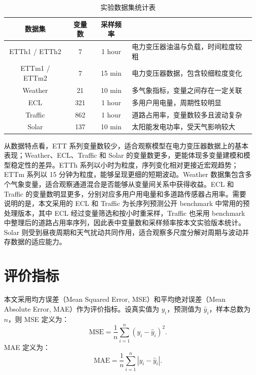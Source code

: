 \begin{table}[htbp]
    \centering
    \caption{实验数据集统计表}
    \label{tab:datasets}
    \begin{tabularx}{\textwidth}{@{}ccc>{\centering\arraybackslash}X@{}}
        \toprule
        \multicolumn{1}{c}{数据集} & \multicolumn{1}{c}{变量数} & \multicolumn{1}{c}{采样频率} & \multicolumn{1}{c}{数据特点} \\
        \midrule
        ETTh1 / ETTh2 & 7 & 1 hour & 电力变压器油温与负载，时间粒度较粗 \\
        ETTm1 / ETTm2 & 7 & 15 min & 电力变压器数据，包含较细粒度变化 \\
        Weather & 21 & 10 min & 多气象指标，变量之间存在一定关联 \\
        ECL & 321 & 1 hour & 多用户用电量，周期性较明显 \\
        Traffic & 862 & 1 hour & 道路占用率，变量数较多且波动复杂 \\
        Solar & 137 & 10 min & 太阳能发电功率，受天气影响较大 \\
        \bottomrule
    \end{tabularx}
\end{table}

从数据特点看，ETT 系列变量数较少，适合观察模型在电力变压器数据上的基本表现；Weather、ECL、Traffic 和 Solar 的变量数更多，更能体现多变量建模和模型稳定性的差异。ETTh 系列以小时为粒度，序列变化相对更接近宏观趋势；ETTm 系列以 15 分钟为粒度，能够呈现更细的短期波动。Weather 数据集包含多个气象变量，适合观察通道混合是否能够从变量间关系中获得收益。ECL 和 Traffic 的变量数明显更多，分别对应多用户用电量和多道路传感器占用率。需要说明的是，本文采用的 ECL 和 Traffic 为长序列预测公开 benchmark 中常用的预处理版本，其中 ECL 经过变量筛选和按小时重采样，Traffic 也采用 benchmark 中整理后的道路占用率序列，因此表中变量数和采样频率按本文实验版本统计。Solar 则受到昼夜周期和天气扰动共同作用，适合观察多尺度分解对周期与波动并存数据的适应能力。

\section{评价指标}

本文采用均方误差（Mean Squared Error, MSE）和平均绝对误差（Mean Absolute Error, MAE）作为评价指标。设真实值为 $y_i$，预测值为 $\hat{y}_i$，样本总数为 $n$，则 MSE 定义为：
\begin{equation}
    \mathrm{MSE} = \frac{1}{n}\sum_{i=1}^{n}(y_i-\hat{y}_i)^2.
\end{equation}
MAE 定义为：
\begin{equation}
    \mathrm{MAE} = \frac{1}{n}\sum_{i=1}^{n}|y_i-\hat{y}_i|.
\end{equation}

